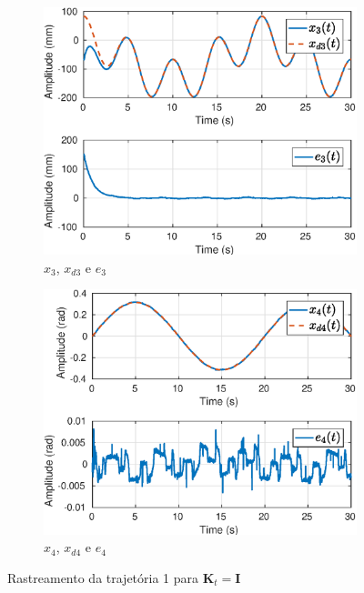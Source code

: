 \begin{figure}[H]
\begin{subfigure}{.5\textwidth}
  \centering
  \includegraphics[width=\linewidth]{./img/traj_1_k1/x3.eps}
  \caption{$x_3$, $x_{d3}$ e $e_3$}
  \label{fig:sub1}
\end{subfigure}%
\begin{subfigure}{.5\textwidth}
  \centering
  \includegraphics[width=\linewidth]{./img/traj_1_k1/x4.eps}
  \caption{$x_4$, $x_{d4}$ e $e_4$}
  \label{fig:sub2}
\end{subfigure}
\caption{Rastreamento da trajetória 1 para $\bm{K}_t = \bm{I}$}
\label{fig:test}
\end{figure}

